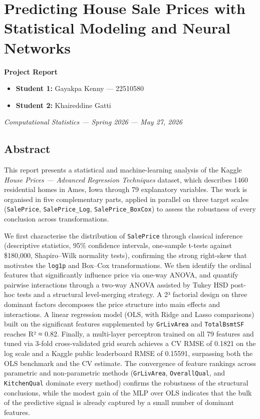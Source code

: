 \section{Predicting House Sale Prices with Statistical Modeling and
Neural
Networks}\label{predicting-house-sale-prices-with-statistical-modeling-and-neural-networks}

\textbf{Project Report}

\begin{itemize}
\tightlist
\item
  \textbf{Student 1:} Gayakpa Kenny --- 22510580
\item
  \textbf{Student 2:} Khaireddine Gatti
\end{itemize}

\emph{Computational Statistics --- Spring 2026 --- May 27, 2026}

\subsection{Abstract}\label{abstract}

This report presents a statistical and machine-learning analysis of the
Kaggle \emph{House Prices --- Advanced Regression Techniques} dataset,
which describes 1460 residential homes in Ames, Iowa through 79
explanatory variables. The work is organised in five complementary
parts, applied in parallel on three target scales (\texttt{SalePrice},
\texttt{SalePrice\_Log}, \texttt{SalePrice\_BoxCox}) to assess the
robustness of every conclusion across transformations.

We first characterise the distribution of \texttt{SalePrice} through
classical inference (descriptive statistics, 95\% confidence intervals,
one-sample t-tests against \$180,000, Shapiro--Wilk normality tests),
confirming the strong right-skew that motivates the \texttt{log1p} and
Box--Cox transformations. We then identify the ordinal features that
significantly influence price via one-way ANOVA, and quantify pairwise
interactions through a two-way ANOVA assisted by Tukey HSD post-hoc
tests and a structural level-merging strategy. A 2³ factorial design on
three dominant factors decomposes the price structure into main effects
and interactions. A linear regression model (OLS, with Ridge and Lasso
comparisons) built on the significant features supplemented by
\texttt{GrLivArea} and \texttt{TotalBsmtSF} reaches R² ≈ 0.82. Finally,
a multi-layer perceptron trained on all 79 features and tuned via 3-fold
cross-validated grid search achieves a CV RMSE of 0.1821 on the log
scale and a Kaggle public leaderboard RMSE of 0.15591, surpassing both
the OLS benchmark and the CV estimate. The convergence of feature
rankings across parametric and non-parametric methods
(\texttt{GrLivArea}, \texttt{OverallQual}, and \texttt{KitchenQual}
dominate every method) confirms the robustness of the structural
conclusions, while the modest gain of the MLP over OLS indicates that
the bulk of the predictive signal is already captured by a small number
of dominant features.

